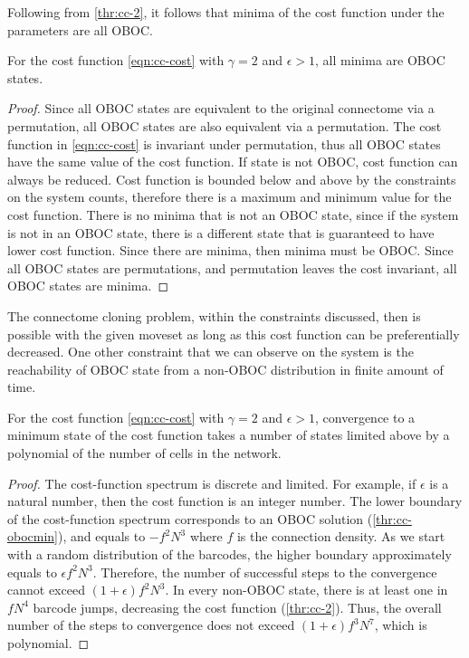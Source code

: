 \documentclass[../dissertation.tex]{subfiles}
\begin{document}
Following from \cref{thr:cc-2}, it follows that minima of the cost function under the parameters are all OBOC.

\begin{corollary}
    \label{thr:cc-obocmin}
    For the cost function \cref{eqn:cc-cost} with $\gamma = 2$ and $\epsilon > 1$, all minima are OBOC states.
\end{corollary}
\begin{proof}
    Since all OBOC states are equivalent to the original connectome via a permutation, all OBOC states are also equivalent via a permutation.
    The cost function in \cref{eqn:cc-cost} is invariant under permutation, thus all OBOC states have the same value of the cost function.
    If state is not OBOC, cost function can always be reduced.
    Cost function is bounded below and above by the constraints on the system counts, therefore there is a maximum and minimum value for the cost function.
    There is no minima that is not an OBOC state, since if the system is not in an OBOC state, there is a different state that is guaranteed to have lower cost function.
    Since there are minima, then minima must be OBOC.
    Since all OBOC states are permutations, and permutation leaves the cost invariant, all OBOC states are minima.
\end{proof}

The connectome cloning problem, within the constraints discussed, then is possible with the given moveset as long as this cost function can be preferentially decreased.
One other constraint that we can observe on the system is the reachability of OBOC state from a non-OBOC distribution in finite amount of time.

\begin{theorem}[Theorem 3]
    \label{thr:cc-3}
    For the cost function \cref{eqn:cc-cost} with $\gamma = 2$ and $\epsilon > 1$, convergence to a minimum state of the cost function takes a number of states limited above by a polynomial of the number of cells in the network.
\end{theorem}

\begin{proof}
    The cost-function spectrum is discrete and limited.
    For example, if $\epsilon$ is a natural number, then the cost function is an integer number.
    The lower boundary of the cost-function spectrum corresponds to an OBOC solution (\cref{thr:cc-obocmin}), and equals to ${−f^2 N^3}$ where $f$ is the connection density.
    As we start with a random distribution of the barcodes, the higher boundary approximately equals to ${\epsilon f^2 N^3}$. Therefore, the number of successful steps to the convergence cannot exceed ${( 1 + \epsilon ) f^2 N^3}$. In every non-OBOC state, there is at least one in $fN^4$ barcode jumps, decreasing the cost function (\cref{thr:cc-2}).
    Thus, the overall number of the steps to convergence does not exceed ${(1+\epsilon)f^3 N^7}$, which is polynomial.
\end{proof}
\end{document}
